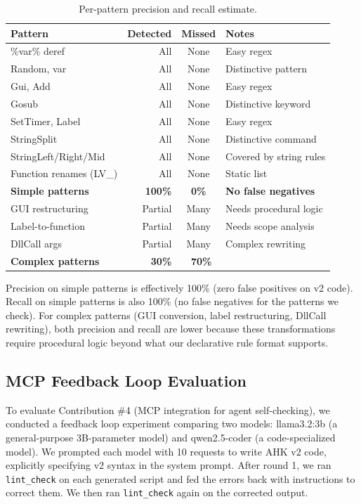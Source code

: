 \documentclass[11pt,a4paper]{article}
\begin{document}
\begin{table}[h]
\centering\small
\caption{Per-pattern precision and recall estimate.}
\label{tab:pr}
\begin{tabular}{lrcl}
\toprule
\textbf{Pattern} & \textbf{Detected} & \textbf{Missed} & \textbf{Notes} \\
\midrule
\%var\% deref & All & None & Easy regex \\
Random, var & All & None & Distinctive pattern \\
Gui, Add & All & None & Easy regex \\
Gosub & All & None & Distinctive keyword \\
SetTimer, Label & All & None & Easy regex \\
StringSplit & All & None & Distinctive command \\
StringLeft/Right/Mid & All & None & Covered by string rules \\
Function renames (LV\_) & All & None & Static list \\
\midrule
\textbf{Simple patterns} & \textbf{100\%} & \textbf{0\%} & \textbf{No false negatives} \\
\midrule
GUI restructuring & Partial & Many & Needs procedural logic \\
Label-to-function & Partial & Many & Needs scope analysis \\
DllCall args & Partial & Many & Complex rewriting \\
\midrule
\textbf{Complex patterns} & \textbf{~30\%} & \textbf{~70\%} & \\
\bottomrule
\end{tabular}
\end{table}

Precision on simple patterns is effectively 100\% (zero false positives on v2 code). Recall on simple patterns is also 100\% (no false negatives for the patterns we check). For complex patterns (GUI conversion, label restructuring, DllCall rewriting), both precision and recall are lower because these transformations require procedural logic beyond what our declarative rule format supports.

\subsection{MCP Feedback Loop Evaluation}

To evaluate Contribution \#4 (MCP integration for agent self-checking), we conducted a feedback loop experiment comparing two models: llama3.2:3b (a general-purpose 3B-parameter model) and qwen2.5-coder (a code-specialized model). We prompted each model with 10 requests to write AHK v2 code, explicitly specifying v2 syntax in the system prompt. After round 1, we ran \texttt{lint\_check} on each generated script and fed the errors back with instructions to correct them. We then ran \texttt{lint\_check} again on the corrected output.
\end{document}
